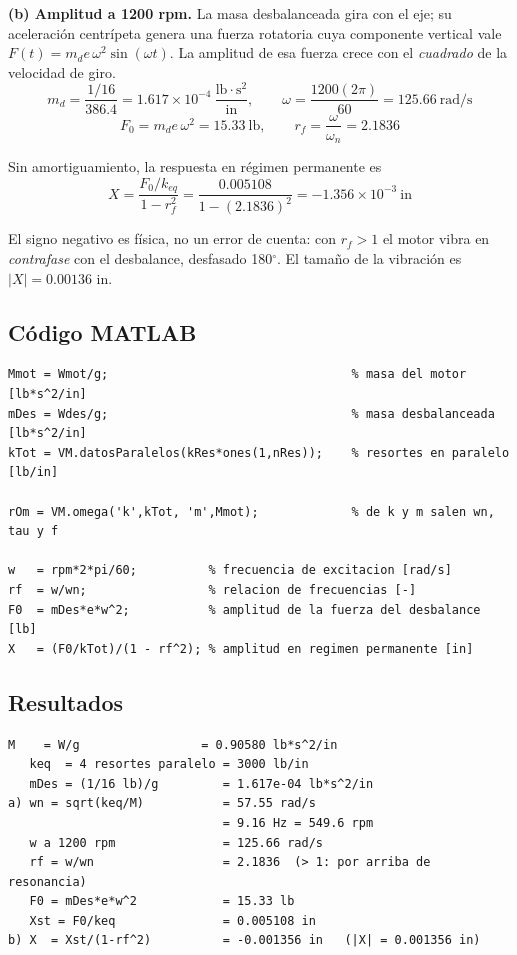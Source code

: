 \documentclass[12pt,letterpaper]{article}
\begin{document}
\textbf{(b) Amplitud a 1200 rpm.} La masa desbalanceada gira con el eje; su
aceleración centrípeta genera una fuerza rotatoria cuya componente vertical vale
$F(t) = m_d e\,\omega^2\sin(\omega t)$. La amplitud de esa fuerza crece con el
\emph{cuadrado} de la velocidad de giro.
\begin{equation}
m_d = \frac{1/16}{386.4} = 1.617\times10^{-4}\ \frac{\text{lb}\cdot\text{s}^2}{\text{in}},
\qquad
\omega = \frac{1200(2\pi)}{60} = 125.66\ \text{rad/s}
\end{equation}
\begin{equation}
F_0 = m_d e\,\omega^2 = 15.33\ \text{lb}, \qquad
r_f = \frac{\omega}{\omega_n} = 2.1836
\end{equation}

Sin amortiguamiento, la respuesta en régimen permanente es
\begin{equation}
X = \frac{F_0/k_{eq}}{1 - r_f^2} = \frac{0.005108}{1 - (2.1836)^2} = -1.356\times10^{-3}\ \text{in}
\end{equation}

El signo negativo es física, no un error de cuenta: con $r_f > 1$ el motor vibra en
\emph{contrafase} con el desbalance, desfasado 180$^\circ$. El tamaño de la vibración
es $|X| = 0.00136$ in.

\subsection{Código MATLAB}
\begin{lstlisting}[style=matlab,numbers=none]
Mmot = Wmot/g;                                  % masa del motor [lb*s^2/in]
mDes = Wdes/g;                                  % masa desbalanceada [lb*s^2/in]
kTot = VM.datosParalelos(kRes*ones(1,nRes));    % resortes en paralelo [lb/in]

rOm = VM.omega('k',kTot, 'm',Mmot);             % de k y m salen wn, tau y f

w   = rpm*2*pi/60;          % frecuencia de excitacion [rad/s]
rf  = w/wn;                 % relacion de frecuencias [-]
F0  = mDes*e*w^2;           % amplitud de la fuerza del desbalance [lb]
X   = (F0/kTot)/(1 - rf^2); % amplitud en regimen permanente [in]
\end{lstlisting}

\subsection{Resultados}
\begin{lstlisting}[style=consola]
   M    = W/g                 = 0.90580 lb*s^2/in
   keq  = 4 resortes paralelo = 3000 lb/in
   mDes = (1/16 lb)/g         = 1.617e-04 lb*s^2/in
a) wn = sqrt(keq/M)           = 57.55 rad/s
                              = 9.16 Hz = 549.6 rpm
   w a 1200 rpm               = 125.66 rad/s
   rf = w/wn                  = 2.1836  (> 1: por arriba de resonancia)
   F0 = mDes*e*w^2            = 15.33 lb
   Xst = F0/keq               = 0.005108 in
b) X  = Xst/(1-rf^2)          = -0.001356 in   (|X| = 0.001356 in)
\end{lstlisting}
\end{document}
